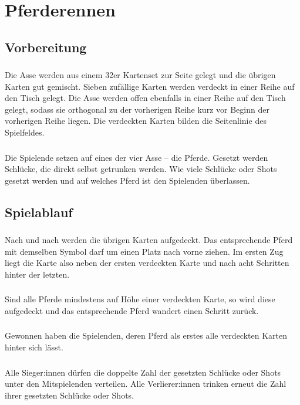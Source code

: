 \section{Pferderennen}
\subsection{Vorbereitung}
\subsubsection{}
Die Asse werden aus einem 32er Kartenset zur Seite gelegt und die übrigen Karten gut gemischt.
Sieben zufällige Karten werden verdeckt in einer Reihe auf den Tisch gelegt.
Die Asse werden offen ebenfalls in einer Reihe auf den Tisch gelegt, sodass sie orthogonal zu der vorherigen Reihe kurz vor Beginn der vorherigen Reihe liegen.
Die verdeckten Karten bilden die Seitenlinie des Spielfeldes.

\subsubsection{}
Die Spielende setzen auf eines der vier Asse – die \glqq{} Pferde\grqq{}.
Gesetzt werden Schlücke, die direkt selbst getrunken werden.
Wie viele Schlücke oder Shots gesetzt werden und auf welches Pferd ist den Spielenden überlassen.

\subsection{Spielablauf}
\subsubsection{}
Nach und nach werden die übrigen Karten aufgedeckt.
Das entsprechende Pferd mit demselben Symbol darf um einen Platz nach vorne ziehen.
Im ersten Zug liegt die Karte also neben der ersten verdeckten Karte und nach acht Schritten hinter der letzten.

\subsubsection{}
Sind alle Pferde mindestens auf Höhe einer verdeckten Karte, so wird diese aufgedeckt und das entsprechende Pferd wandert einen Schritt zurück.

\subsubsection{}
Gewonnen haben die Spielenden, deren Pferd als erstes alle verdeckten Karten hinter sich lässt.

\subsubsection{}
Alle Sieger:innen dürfen die doppelte Zahl der gesetzten Schlücke oder Shots unter den Mitspielenden verteilen.
Alle Verlierer:innen trinken erneut die Zahl ihrer gesetzten Schlücke oder Shots.
